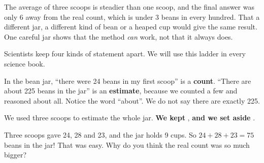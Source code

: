 \begin{center}
\end{center}

{The average of three scoops is steadier than one scoop, and the final answer was only 6 away from the real count, which is under 3 beans in every hundred.}
{That a different jar, a different kind of bean or a heaped cup would give the same result. One careful jar shows that the method \emph{can} work, not that it always does.}

Scientists keep four kinds of statement apart. We will use this ladder in every science book.

\begin{center}\ladder[0.8]\end{center}

In the bean jar, ``there were 24 beans in my first scoop'' is a \textbf{count}. ``There are about 225 beans in the jar'' is an \textbf{estimate}, because we counted a few and reasoned about all. Notice the word ``about''. We do not say there are exactly 225.

\begin{keepbox}
We used three scoops to estimate the whole jar. \textbf{We kept} \wline[3cm], \textbf{and we set aside} \wline[3.5cm].
\end{keepbox}

\begin{multix}[wow]\multixbot[wow]\tcblower
Three scoops gave 24, 28 and 23, and the jar holds 9 cups. So $24+28+23=75$ beans in the jar! That was easy. Why do you think the real count was so much bigger?
\end{multix}

